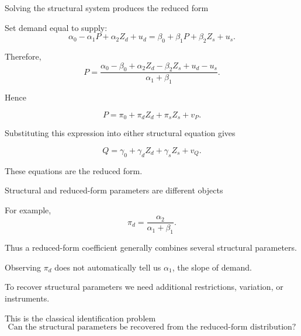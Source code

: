 \documentclass[aspectratio=169,11pt]{beamer}
\begin{document}
\begin{frame}{Solving the structural system produces the reduced form}

Set demand equal to supply:
\[
\alpha_0-\alpha_1P+\alpha_2Z_d+u_d
=
\beta_0+\beta_1P+\beta_2Z_s+u_s.
\]

Therefore,
\[
P
=
\frac{
\alpha_0-\beta_0
+\alpha_2Z_d-\beta_2Z_s
+u_d-u_s
}{
\alpha_1+\beta_1
}.
\]

Hence

\[
\boxed{
P
=
\pi_0
+
\pi_d Z_d
+
\pi_s Z_s
+
v_P.
}
\]

Substituting this expression into either structural equation gives

\[
\boxed{
Q
=
\gamma_0
+
\gamma_d Z_d
+
\gamma_s Z_s
+
v_Q.
}
\]

These equations are the reduced form.

\end{frame}

\begin{frame}{Structural and reduced-form parameters are different objects}

For example,
\[
\pi_d
=
\frac{\alpha_2}{\alpha_1+\beta_1}.
\]

Thus a reduced-form coefficient generally combines several structural
parameters.

\vspace{0.35em}

Observing $\pi_d$ does not automatically tell us $\alpha_1$,
the slope of demand.

To recover structural parameters we need additional restrictions,
variation, or instruments.

\vspace{0.4em}

\begin{block}{This is the classical identification problem}
\[
\boxed{
\text{Can the structural parameters be recovered from
the reduced-form distribution?}
}
\]
\end{block}

\end{frame}
\end{document}
